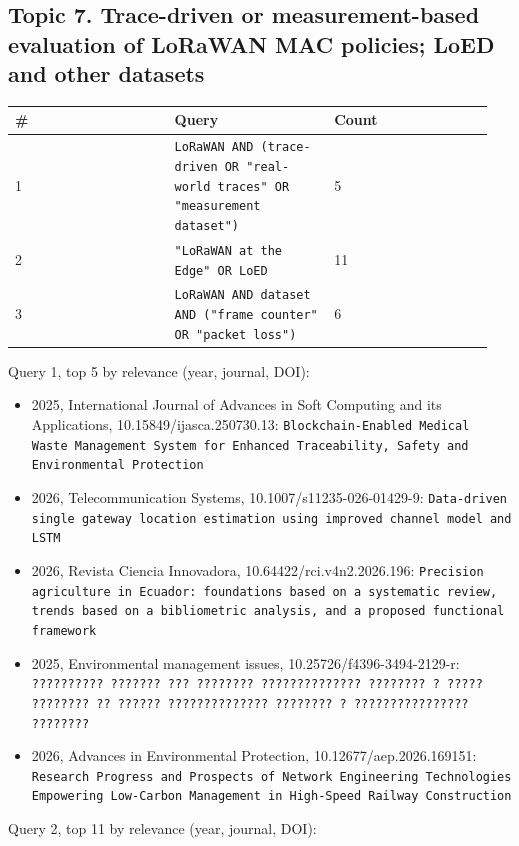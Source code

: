 \subsection*{Topic 7. Trace-driven or measurement-based evaluation of LoRaWAN MAC policies; LoED and other datasets}

{\scriptsize\raggedright
\begin{longtable}{p{0.317\linewidth}p{0.317\linewidth}p{0.317\linewidth}}
\toprule
\# & Query & Count \\
\midrule
\endhead
1 & \texttt{LoRaWAN AND (trace-driven OR "real-world traces" OR "measurement dataset")} & 5 \\
2 & \texttt{"LoRaWAN at the Edge" OR LoED} & 11 \\
3 & \texttt{LoRaWAN AND dataset AND ("frame counter" OR "packet loss")} & 6 \\
\bottomrule
\end{longtable}}

Query 1, top 5 by relevance (year, journal, DOI):

\begin{itemize}
\item 2025, International Journal of Advances in Soft Computing and its Applications, 10.15849/ijasca.250730.13: \texttt{Blockchain-Enabled Medical Waste Management System for Enhanced Traceability, Safety and Environmental Protection}
\item 2026, Telecommunication Systems, 10.1007/s11235-026-01429-9: \texttt{Data-driven single gateway location estimation using improved channel model and LSTM}
\item 2026, Revista Ciencia Innovadora, 10.64422/rci.v4n2.2026.196: \texttt{Precision agriculture in Ecuador: foundations based on a systematic review, trends based on a bibliometric analysis, and a proposed functional framework}
\item 2025, Environmental management issues, 10.25726/f4396-3494-2129-r: \texttt{?????????? ??????? ??? ???????? ?????????????? ???????? ? ????? ???????? ?? ?????? ?????????????? ???????? ? ???????????????? ????????}
\item 2026, Advances in Environmental Protection, 10.12677/aep.2026.169151: \texttt{Research Progress and Prospects of Network Engineering Technologies Empowering Low-Carbon Management in High-Speed Railway Construction}
\end{itemize}

Query 2, top 11 by relevance (year, journal, DOI):

